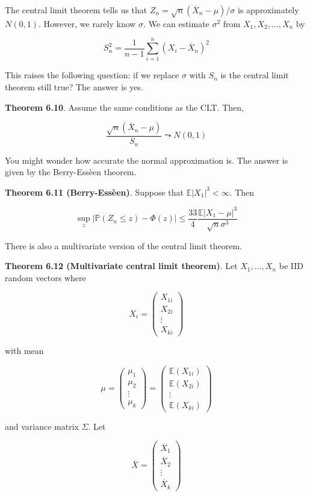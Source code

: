 The central limit theorem tells us that
\(Z_n = \sqrt{n}(\overline{X}_n - \mu)/\sigma\) is approximately
\(N(0, 1)\). However, we rarely know \(\sigma\). We can estimate
\(\sigma^2\) from \(X_1, X_2, \dots, X_n\) by

\[ S_n^2 = \frac{1}{n - 1} \sum_{i=1}^n ( X_i - \overline{X}_n )^2 \]

This raises the following question: if we replace \(\sigma\) with
\(S_n\) is the central limit theorem still true? The answer is yes.

\textbf{Theorem 6.10}. Assume the same conditions as the CLT. Then,

\[ \frac{\sqrt{n} \left(\overline{X}_n - \mu \right)}{S_n} \leadsto N(0, 1)\]

You might wonder how accurate the normal approximation is. The answer is
given by the Berry-Essèen theorem.

\textbf{Theorem 6.11 (Berry-Essèen)}. Suppose that
\(\mathbb{E}|X_1|^3 < \infty\). Then

\[ \sup _z |\mathbb{P}(Z_n \leq z) - \Phi(z)| \leq \frac{33}{4} \frac{\mathbb{E}|X_1 - \mu|^3}{\sqrt{n}\sigma^3} \]

There is also a multivariate version of the central limit theorem.

\textbf{Theorem 6.12 (Multivariate central limit theorem)}. Let
\(X_1, \dots, X_n\) be IID random vectors where

\[ X_i = \begin{pmatrix} X_{1i} \\ X_{2i} \\ \vdots \\ X_{ki} \end{pmatrix}\]

with mean

\[ \mu 
= \begin{pmatrix} \mu_1 \\ \mu_2 \\ \vdots \\ \mu_k \end{pmatrix} 
= \begin{pmatrix} \mathbb{E}(X_{1i}) \\ \mathbb{E}(X_{2i}) \\ \vdots \\ \mathbb{E}(X_{ki}) \end{pmatrix} \]

and variance matrix \(\Sigma\). Let

\[ \overline{X} = \begin{pmatrix} \overline{X}_1 \\ \overline{X}_2 \\ \vdots \\ \overline{X}_k \end{pmatrix}\]

